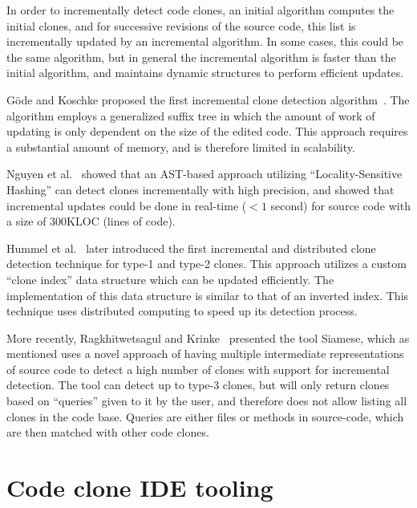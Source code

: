 In order to incrementally detect code clones, an initial algorithm computes the initial
clones, and for successive revisions of the source code, this list is incrementally
updated by an incremental algorithm. In some cases, this could be the same algorithm, but
in general the incremental algorithm is faster than the initial algorithm, and maintains
dynamic structures to perform efficient updates. 

Göde and Koschke proposed the first incremental clone detection
algorithm~\cite{GodeIncrementalCloneDetection}. The algorithm employs a generalized suffix
tree in which the amount of work of updating is only dependent on the size of the edited
code. This approach requires a substantial amount of memory, and is therefore limited in
scalability.

Nguyen et al.~\cite{LocalitySensitiveHashingIncremental} showed that an AST-based approach
utilizing ``Locality-Sensitive Hashing'' can detect clones incrementally with high
precision, and showed that incremental updates could be done in real-time ($< 1$ second)
for source code with a size of 300KLOC (lines of code).

Hummel et al.~\cite{IndexBasedIncrementalCloneDetection} later introduced the first
incremental and distributed clone detection technique for type-1 and type-2 clones. This
approach utilizes a custom ``clone index'' data structure which can be updated
efficiently. The implementation of this data structure is similar to that of an inverted
index. This technique uses distributed computing to speed up its detection process.

More recently, Ragkhitwetsagul and Krinke~\cite{SiameseScalableAndIncrementalClone}
presented the tool Siamese, which as mentioned uses a novel approach of having multiple
intermediate representations of source code to detect a high number of clones with support
for incremental detection. The tool can detect up to type-3 clones, but will only return
clones based on ``queries'' given to it by the user, and therefore does not allow listing
all clones in the code base. Queries are either files or methods in source-code, which are
then matched with other code clones.

\section{Code clone IDE tooling}

